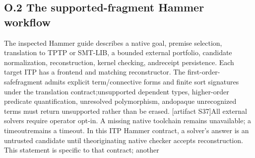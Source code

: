 \subsection*{O.2  The supported-fragment Hammer workflow}
\noindent
The inspected Hammer guide describes a native goal, premise selection, translation to TPTP or SMT-\linebreak[4]
LIB, a bounded external portfolio, candidate normalization, reconstruction, kernel checking, and\linebreak[4]
receipt persistence. Each target ITP has a frontend and matching reconstructor. The first-order-safe\linebreak[4]
fragment admits explicit term/connective forms and finite sort signatures under the translation contract;\linebreak[4]
unsupported dependent types, higher-order predicate quantification, unresolved polymorphism, and\linebreak[4]
opaque unrecognized terms must return unsupported rather than be erased. [artifact S37]\linebreak[4]
All external solvers require operator opt-in. A missing native toolchain remains unavailable; a timeout\linebreak[4]
remains a timeout. In this ITP Hammer contract, a solver's answer is an untrusted candidate until the\linebreak[4]
originating native checker accepts reconstruction. This statement is specific to that contract; another\par

